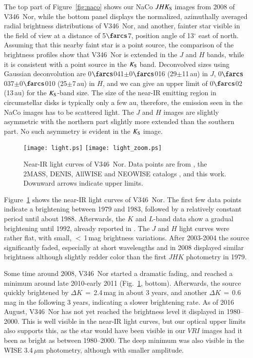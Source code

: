 \documentclass{aa}
\begin{document}
The top part of Figure~\ref{fig:naco} shows our NaCo $JHK_{\rm S}$
images from 2008 of V346~Nor, while the bottom panel displays the
normalized, azimuthally averaged radial brightness distributions of
V346~Nor, and another, fainter star visible in the field of view at a
distance of 5$\farcs$7, position angle of 13$^{\circ}$ east of
north. Assuming that this nearby faint star is a point source, the
comparison of the brightness profiles show that V346~Nor is extended
in the $J$ and $H$ bands, while it is consistent with a point source
in the $K_{\rm S}$ band. Deconvolved sizes using Gaussian
deconvolution are 0$\farcs$041$\pm$0$\farcs$016 (29$\pm$11\,au) in
$J$, 0$\farcs$037$\pm$0$\farcs$010 (25$\pm$7\,au) in $H$, and we can
give an upper limit of 0$\farcs$02 (13\,au) for the $K_{\rm S}$-band
size. The size of the near-IR emitting region in circumstellar disks
is typically only a few au, therefore, the emission seen in the NaCo
images has to be scattered light. The $J$ and $H$ images are slightly
asymmetric with the northern part slightly more extended than the
southern part. No such asymmetry is evident in the $K_{\rm S}$ image.

\begin{figure}
\centering
\texttt{[image: light.ps]}
\texttt{[image: light\_zoom.ps]}
\caption{Near-IR light curves of V346~Nor. Data points are from
  \citet{elias1980, frogel1983, graham1985, reipurth1983a,
    reipurth1983b, reipurth1985, kh1991, molinari1993, prusti1993,
    reipurth1997, quanz2007, connelley2008}, the 2MASS, DENIS, AllWISE
  and NEOWISE catalogs \citep{cutri2003, cutri2013, cutri2015}, and
  this work. Downward arrows indicate upper limits.}
\label{fig:light}
\end{figure}


Figure~\ref{fig:light} shows the near-IR light curves of V346~Nor. The
first few data points indicate a brightening between 1979 and 1983,
followed by a relatively constant period until about 1988. Afterwards,
the $K$ and $L$-band data show a gradual brightening until 1992,
already reported in \citet{abraham2004}. The $J$ and $H$ light curves
were rather flat, with small, $<$\,1\,mag brightness variations.
After 2003-2004 the source significantly faded, especially at short
wavelengths and in 2008 displayed similar brightness although slightly
redder color than the first $JHK$ photometry in 1979.

Some time around 2008, V346~Nor started a dramatic fading, and reached
a minimum around late 2010-early 2011 (Fig.~\ref{fig:light},
bottom). Afterwards, the source quickly brightened by
$\Delta{}K\,=\,$2.4\,mag in about 3 years, and another
$\Delta{}K\,=\,$0.6\,mag in the following 3 years, indicating a slower
brightening rate. As of 2016 August, V346~Nor has not yet reached the
brightness level it displayed in 1980--2000. This is well visible in
the near-IR light curves, but our optical upper limits also supports
this, as the star would have been visible in our $VRI$ images had it
been as bright as between 1980--2000. The deep minimum was also
visible in the WISE 3.4$\,\mu$m photometry, although with smaller
amplitude.
\end{document}
